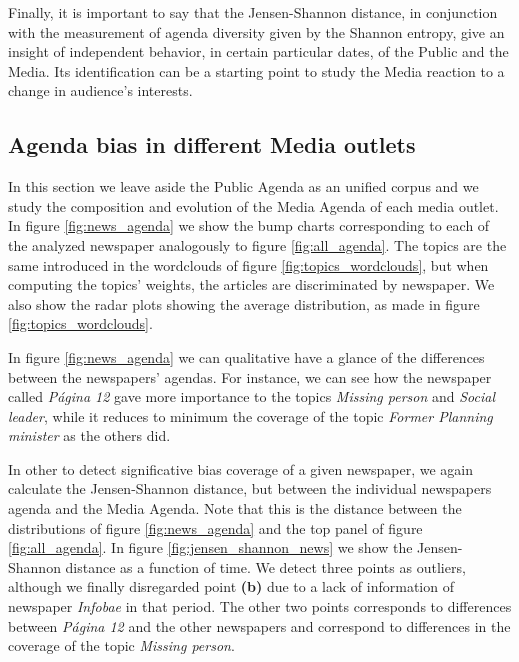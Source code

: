 \documentclass{bmcart}
\begin{document}
\par %
Finally, it is important to say that the Jensen-Shannon distance, in conjunction with the measurement of agenda diversity given by the Shannon entropy, give an insight of independent behavior, in certain particular dates,  of the Public and the Media. Its identification can be a starting point to study the Media reaction to a change in audience's interests.
 
\subsection*{Agenda bias in different Media outlets}

\par In this section we leave aside the Public Agenda as an unified corpus and we study the composition and evolution of the Media Agenda of each media outlet. 
In figure \ref{fig:news_agenda} we show the bump charts corresponding to each of the analyzed newspaper analogously to figure \ref{fig:all_agenda}.
The topics are the same introduced in the wordclouds of figure \ref{fig:topics_wordclouds}, but when computing the topics' weights,  the articles are discriminated by newspaper. 
We also show the radar plots showing the average distribution, as made in figure \ref{fig:topics_wordclouds}. 

\par In figure \ref{fig:news_agenda} we can qualitative have a glance of the  differences between the newspapers' agendas.
For instance, we can see how the newspaper called \emph{P\'agina 12} gave more importance to the topics \emph{Missing person} and \emph{Social leader}, while it reduces to minimum the coverage of the topic  \emph{Former Planning minister} as the others did.

\par In other to detect significative bias coverage of a given newspaper, we again calculate the Jensen-Shannon distance, but between the individual newspapers agenda and the Media Agenda.
Note that this is the distance between the distributions of figure \ref{fig:news_agenda} and the top panel of figure \ref{fig:all_agenda}. 
 In figure \ref{fig:jensen_shannon_news} we show the Jensen-Shannon distance as a function of time.
We detect three points as outliers, although we finally disregarded point \textbf{(b)} due to a lack of  information of newspaper \emph{Infobae} in that period. 
The other two points corresponds to differences between \emph{P\'agina 12} and the other newspapers and correspond to differences in the coverage of the topic \emph{Missing person}.
\end{document}
